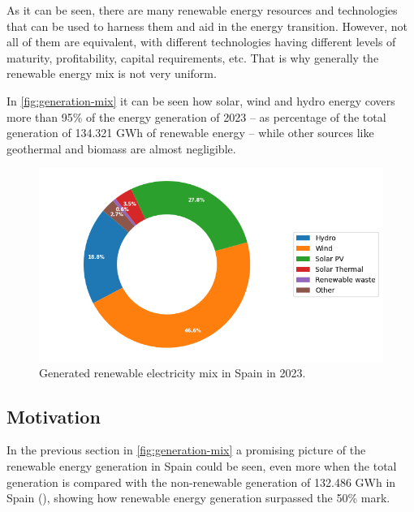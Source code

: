As it can be seen, there are many renewable energy resources and technologies that can be used to harness them and aid in the energy transition. However, not all of them are equivalent, with different technologies having different levels of maturity, profitability, capital requirements, etc. That is why generally the renewable energy mix is not very uniform. 

In \autoref{fig:generation-mix} it can be seen how solar, wind and hydro energy covers more than 95\% of the energy generation of 2023 -- as percentage of the total generation of 134.321 GWh of renewable energy -- while other sources like geothermal and biomass are almost negligible. 

\begin{figure}[ht]
    \centering
    \captionsetup{justification=centering}
    \includegraphics[width=0.7\linewidth]{assets/generation-mix.png}
    \caption{Generated renewable electricity mix in Spain in 2023. \cite{renewable_generation_reports_2023}}
    \label{fig:generation-mix}
\end{figure}

\subsection{Motivation}
\label{sec:motivation}

In the previous section in \autoref{fig:generation-mix} a promising picture of the renewable energy generation in Spain could be seen, even more when the total generation is compared with the non-renewable generation of 132.486 GWh in Spain (\cite{renewable_generation_reports_2023}), showing how renewable energy generation surpassed the 50\% mark.

